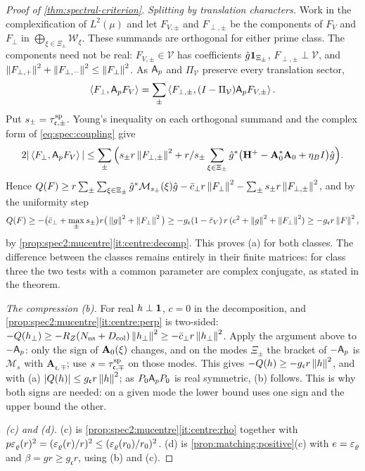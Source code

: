 \begin{proof}[Proof of \cref{thm:spectral-criterion}]
\emph{Splitting by translation characters.} Work in the complexification of
$L^2(\mu)$ and let $F_{V,\pm}$ and $F_{\perp,\pm}$ be the components of $F_V$ and
$F_\perp$ in $\bigoplus_{\xi\in\Xi_\pm}\mathcal W_\xi$. These summands are
orthogonal for either prime class. The components need not be real:
$F_{V,\pm}\in\mathcal V$ has coefficients $\hat g\mathbf 1_{\Xi_\pm}$,
$F_{\perp,\pm}\perp\mathcal V$, and
$\left\|F_{\perp,+}\right\|^2+\left\|F_{\perp,-}\right\|^2\le\left\|F_\perp\right\|^2$.
As $\mathsf A_p$ and $\Pi_{\mathcal V}$ preserve every translation sector,
\[
 \left\langle F_\perp,\mathsf A_p F_V\right\rangle
 =\sum_\pm\left\langle F_{\perp,\pm},(I-\Pi_{\mathcal V})\mathsf A_p F_{V,\pm}\right\rangle.
\]
Put $s_\pm=\tau^{\rm sp}_{\mathfrak c,\pm}$. Young's inequality on each
orthogonal summand and the complex form of \eqref{eq:spec:coupling} give
\[
  2|\left\langle F_\perp,\mathsf A_p F_V\right\rangle|\le\sum_\pm\Big(s_\pm r\left\|F_{\perp,\pm}\right\|^2
  +r/s_\pm\sum_{\xi\in\Xi_\pm}\hat g^*\big(\mathbf H^+-\mathbf A_{0}^*\mathbf A_{0}+\eta_BI\big)\hat g\Big).
\]
Hence
$Q(F)\ge r\sum_\pm\sum_{\xi\in\Xi_\pm}\hat g^*\mathcal M_{s_\pm}(\xi)\hat g-\bar c_{\perp} r\left\|F_\perp\right\|^2
-\sum_\pm s_\pm r\left\|F_{\perp,\pm}\right\|^2$, and by the uniformity step
\[
  Q(F)\ge-\big(\bar c_{\perp}+\max_\pm s_\pm\big)r\big(\left\|g\right\|^2+\left\|F_\perp\right\|^2\big)
  \ge-g_{\mathfrak c}(1-\bar{\varepsilon}_V)\,r\,(c^2+\left\|g\right\|^2+\left\|F_\perp\right\|^2)
  \ge-g_{\mathfrak c}r\left\|F\right\|^2,
\]
by \cref{prop:spec2:mucentre}\ref{it:centre:decomp}. This proves (a) for both
classes. The difference between the classes remains entirely in their finite
matrices: for class three the two tests with a common parameter are complex
conjugate, as stated in the theorem.

\emph{The compression (b).} For real $h\perp\mathbf 1$, $c=0$ in the decomposition, and
\cref{prop:spec2:mucentre}\ref{it:centre:perp} is two-sided:
$-Q(h_\perp)\ge-R_Z(N_{\rm ns}+D_{\rm col})\left\|h_\perp\right\|^2\ge-\bar c_{\perp} r\left\|h_\perp\right\|^2$. Apply the
argument above to $-\mathsf A_p$: only the sign of $\mathbf A_{0}(\xi)$ changes, and on the modes
$\Xi_\pm$ the bracket of $-\mathsf A_p$ is $\mathcal M_s$ with $\mathbf A_{\mathfrak c,\mp}$; use
$s=\tau^{\rm sp}_{\mathfrak c,\mp}$ on those modes.
This gives $-Q(h)\ge-g_{\mathfrak c}r\left\|h\right\|^2$, and with (a)
$|Q(h)|\le g_{\mathfrak c}r\left\|h\right\|^2$; as $P_0\mathsf A_p P_0$ is real symmetric, (b) follows. This
is why both signs are needed: on a given mode the lower bound uses one sign and the
upper bound the other.

\emph{(c) and (d).} (c) is \cref{prop:spec2:mucentre}\ref{it:centre:rho} together with
$p\varepsilon_\varrho(r)^2=(\varepsilon_\varrho(r)/r)^2\le(\varepsilon_\varrho(r_0)/r_0)^2$. (d) is
\cref{prop:matching:positive}(c) with $e=\varepsilon_\varrho$ and $\beta=gr\ge g_{\mathfrak c}r$, using (b)
and (c).
\end{proof}

